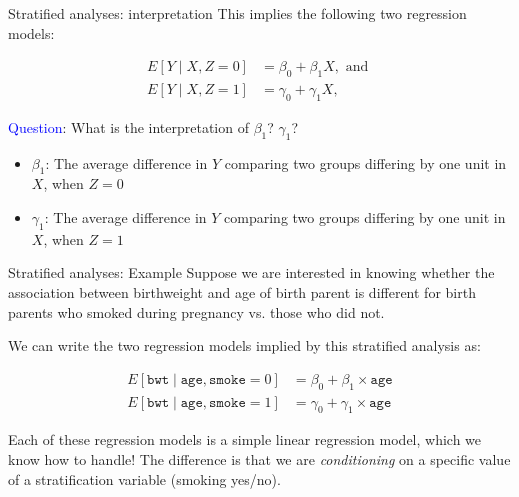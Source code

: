 \documentclass[10pt,t]{beamer}
\begin{document}
\begin{frame}{Stratified analyses: interpretation}
This implies the following two regression models:

\begin{align*}
E[Y \mid X, Z = 0] & = \beta_0 + \beta_1 X, \text{ and } \\
E[Y \mid X, Z = 1] & = \gamma_0 + \gamma_1 X,
\end{align*} 

\textcolor{blue}{Question}: What is the interpretation of $\beta_1$? $\gamma_1$? \pause

\begin{itemize}
	\item $\beta_1$: The average difference in $Y$ comparing two groups differing by one unit in $X$, when $Z = 0$ \pause
	\item $\gamma_1$: The average difference in $Y$ comparing two groups differing by one unit in $X$, when $Z = 1$
\end{itemize}
\end{frame}

\begin{frame}{Stratified analyses: Example}
Suppose we are interested in knowing whether the association between birthweight and age of birth parent is different for birth parents who smoked during pregnancy vs. those who did not.

\vspace{0.3cm}

We can write the two regression models implied by this stratified analysis as:

\begin{align*}
E[\texttt{bwt} \mid \texttt{age}, \texttt{smoke} = 0] & = \beta_0 + \beta_1 \times \texttt{age} \\
E[\texttt{bwt} \mid \texttt{age}, \texttt{smoke} = 1] & = \gamma_0 + \gamma_1 \times \texttt{age}
\end{align*}

Each of these regression models is a simple linear regression model, which we know how to handle! The difference is that we are \textit{conditioning} on a specific value of a stratification variable (smoking yes/no).


\end{frame}
\end{document}

